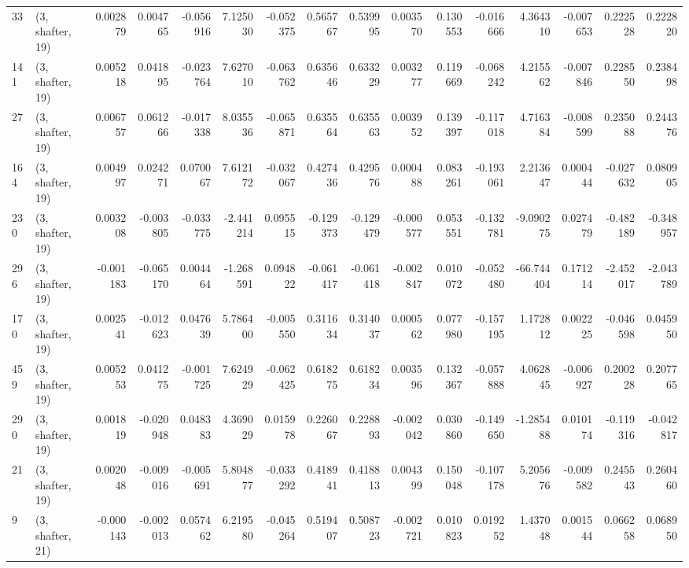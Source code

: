 \begin{tabular}{llrrrrrrrrrrrrrr}
33  &  (3, shafter, 19) &   0.002879 &  0.004765 & -0.056916 &   7.125030 & -0.052375 &   0.565767 &  0.539995 &  0.003570 &  0.130553 & -0.016666 &     4.364310 &  -0.007653 &   0.222528 &   0.222820 \\
141 &  (3, shafter, 19) &   0.005218 &  0.041895 & -0.023764 &   7.627010 & -0.063762 &   0.635646 &  0.633229 &  0.003277 &  0.119669 & -0.068242 &     4.215562 &  -0.007846 &   0.228550 &   0.238498 \\
27  &  (3, shafter, 19) &   0.006757 &  0.061266 & -0.017338 &   8.035536 & -0.065871 &   0.635564 &  0.635563 &  0.003952 &  0.139397 & -0.117018 &     4.716384 &  -0.008599 &   0.235088 &   0.244376 \\
164 &  (3, shafter, 19) &   0.004997 &  0.024271 &  0.070067 &   7.612172 & -0.032067 &   0.427436 &  0.429576 &  0.000488 &  0.083261 & -0.193061 &     2.213647 &   0.000444 &  -0.027632 &   0.080905 \\
230 &  (3, shafter, 19) &   0.003208 & -0.003805 & -0.033775 &  -2.441214 &  0.095515 &  -0.129373 & -0.129479 & -0.000577 &  0.053551 & -0.132781 &    -9.090275 &   0.027479 &  -0.482189 &  -0.348957 \\
296 &  (3, shafter, 19) &  -0.001183 & -0.065170 &  0.004464 &  -1.268591 &  0.094822 &  -0.061417 & -0.061418 & -0.002847 &  0.010072 & -0.052480 &   -66.744404 &   0.171214 &  -2.452017 &  -2.043789 \\
170 &  (3, shafter, 19) &   0.002541 & -0.012623 &  0.047639 &   5.786400 & -0.005550 &   0.311634 &  0.314037 &  0.000562 &  0.077980 & -0.157195 &     1.172812 &   0.002225 &  -0.046598 &   0.045950 \\
459 &  (3, shafter, 19) &   0.005253 &  0.041275 & -0.001725 &   7.624929 & -0.062425 &   0.618275 &  0.618234 &  0.003596 &  0.132367 & -0.057888 &     4.062845 &  -0.006927 &   0.200228 &   0.207765 \\
290 &  (3, shafter, 19) &   0.001819 & -0.020948 &  0.048383 &   4.369029 &  0.015978 &   0.226067 &  0.228893 & -0.002042 &  0.030860 & -0.149650 &    -1.285488 &   0.010174 &  -0.119316 &  -0.042817 \\
21  &  (3, shafter, 19) &   0.002048 & -0.009016 & -0.005691 &   5.804877 & -0.033292 &   0.418941 &  0.418813 &  0.004399 &  0.150048 & -0.107178 &     5.205676 &  -0.009582 &   0.245543 &   0.260460 \\
9   &  (3, shafter, 21) &  -0.000143 & -0.002013 &  0.057462 &   6.219580 & -0.045264 &   0.519407 &  0.508723 & -0.002721 &  0.010823 &  0.019252 &     1.437048 &   0.001544 &   0.066258 &   0.068950 \\

\end{tabular}
